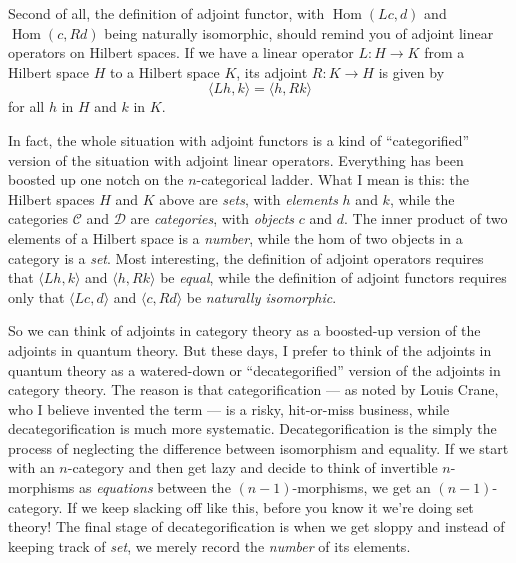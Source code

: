 \documentclass{article}
\begin{document}
Second of all, the definition of adjoint functor, with
\(\operatorname{Hom}(Lc,d)\) and \(\operatorname{Hom}(c,Rd)\) being
naturally isomorphic, should remind you of adjoint linear operators on
Hilbert spaces. If we have a linear operator \(L\colon H\to K\) from a
Hilbert space \(H\) to a Hilbert space \(K\), its adjoint
\(R\colon K \to H\) is given by
\[\langle Lh,k \rangle = \langle h,Rk \rangle\] for all \(h\) in \(H\)
and \(k\) in \(K\).

In fact, the whole situation with adjoint functors is a kind of
``categorified'' version of the situation with adjoint linear operators.
Everything has been boosted up one notch on the \(n\)-categorical
ladder. What I mean is this: the Hilbert spaces \(H\) and \(K\) above
are \emph{sets}, with \emph{elements} \(h\) and \(k\), while the
categories \(\mathcal{C}\) and \(\mathcal{D}\) are \emph{categories},
with \emph{objects} \(c\) and \(d\). The inner product of two elements
of a Hilbert space is a \emph{number}, while the hom of two objects in a
category is a \emph{set}. Most interesting, the definition of adjoint
operators requires that \(\langle Lh,k \rangle\) and
\(\langle h,Rk \rangle\) be \emph{equal}, while the definition of
adjoint functors requires only that \(\langle Lc,d \rangle\) and
\(\langle c,Rd \rangle\) be \emph{naturally isomorphic}.

So we can think of adjoints in category theory as a boosted-up version
of the adjoints in quantum theory. But these days, I prefer to think of
the adjoints in quantum theory as a watered-down or ``decategorified''
version of the adjoints in category theory. The reason is that
categorification --- as noted by Louis Crane, who I believe invented the
term --- is a risky, hit-or-miss business, while decategorification is
much more systematic. Decategorification is the simply the process of
neglecting the difference between isomorphism and equality. If we start
with an \(n\)-category and then get lazy and decide to think of
invertible \(n\)-morphisms as \emph{equations} between the
\((n-1)\)-morphisms, we get an \((n-1)\)-category. If we keep slacking
off like this, before you know it we're doing set theory! The final
stage of decategorification is when we get sloppy and instead of keeping
track of \emph{set}, we merely record the \emph{number} of its elements.
\end{document}

